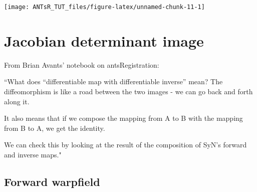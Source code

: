 \documentclass[]{tufte-handout}
\newenvironment{Shaded}{}{}
\newcommand{\DataTypeTok}[1]{\textcolor[rgb]{0.56,0.13,0.00}{#1}}
\newcommand{\DecValTok}[1]{\textcolor[rgb]{0.25,0.63,0.44}{#1}}
\newcommand{\KeywordTok}[1]{\textcolor[rgb]{0.00,0.44,0.13}{\textbf{#1}}}
\newcommand{\NormalTok}[1]{#1}
\newcommand{\OperatorTok}[1]{\textcolor[rgb]{0.40,0.40,0.40}{#1}}
\newcommand{\StringTok}[1]{\textcolor[rgb]{0.25,0.44,0.63}{#1}}
\begin{document}
\begin{Shaded}
\end{Shaded}

\texttt{[image: ANTsR\_TUT\_files/figure-latex/unnamed-chunk-11-1]}

\hypertarget{jacobian-determinant-image}{%
\section{Jacobian determinant image}\label{jacobian-determinant-image}}

From Brian Avants' notebook on antsRegistration:

``What does ``differentiable map with differentiable inverse'' mean? The
diffeomorphism is like a road between the two images - we can go back
and forth along it.

It also means that if we compose the mapping from A to B with the
mapping from B to A, we get the identity.

We can check this by looking at the result of the composition of SyN's
forward and inverse maps."

\hypertarget{forward-warpfield}{%
\subsection{Forward warpfield}\label{forward-warpfield}}
\end{document}
